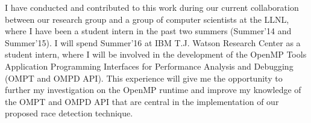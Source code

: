 I have conducted and contributed to this work during our current collaboration
between our research group and a group of computer scientists at the LLNL,
where I have been a student intern in the past two summers (Summer'14 and
Summer'15).
%
I will spend Summer'16 at IBM T.J. Watson Research Center as a student intern,
where I will be involved in the development of the OpenMP Tools Application
Programming Interfaces for Performance Analysis and Debugging~\cite{ompt}
(OMPT and OMPD API).
%
This experience will give me the opportunity to further my investigation on
the OpenMP runtime and improve my knowledge of the OMPT and OMPD API that are
central in the implementation of our proposed race detection technique.

